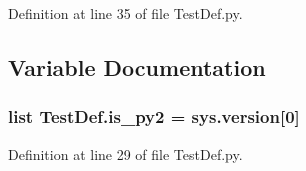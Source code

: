 Definition at line 35 of file Test\-Def.\-py.



\subsection{Variable Documentation}
\hypertarget{namespaceTestDef_a4e87724b7a6a117c2cca22c557936868}{
\subsubsection[{is\-\_\-py2}]{\setlength{\rightskip}{0pt plus 5cm}list Test\-Def.\-is\-\_\-py2 = sys.\-version\mbox{[}0\mbox{]}}}\label{namespaceTestDef_a4e87724b7a6a117c2cca22c557936868}


Definition at line 29 of file Test\-Def.\-py.

